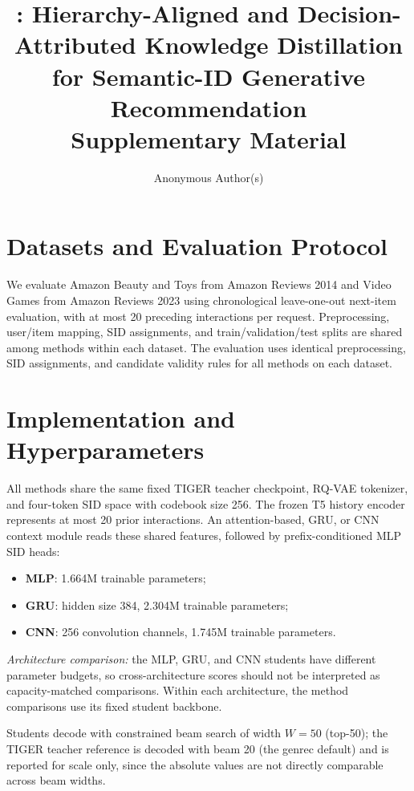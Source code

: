 \documentclass[sigconf, anonymous, review]{acmart}
\title{\method: Hierarchy-Aligned and Decision-Attributed Knowledge
Distillation for Semantic-ID Generative Recommendation\\
Supplementary Material}
\author{Anonymous Author(s)}
\affiliation{%
  \institution{Anonymous Institution}
  \city{Anonymous City}
  \country{Anonymous Country}
}
\begin{document}
\maketitle

\section{Datasets and Evaluation Protocol}
\label{sec:sup-datasets}

We evaluate Amazon Beauty and Toys from Amazon Reviews 2014 and Video
Games from Amazon Reviews 2023 using chronological leave-one-out
next-item evaluation, with at most 20 preceding interactions per
request. Preprocessing, user/item mapping, SID assignments, and
train/validation/test splits are shared among methods within each
dataset. The evaluation uses identical preprocessing, SID assignments,
and candidate validity rules for all methods on each dataset.

\section{Implementation and Hyperparameters}
\label{sec:sup-hyper}

All methods share the same fixed TIGER teacher checkpoint, RQ-VAE
tokenizer, and four-token SID space with codebook size 256. The frozen T5 history encoder represents at most 20 prior
interactions. An attention-based, GRU, or CNN context module reads these
shared features, followed by prefix-conditioned MLP SID heads:

\begin{itemize}
\item \textbf{MLP}: 1.664M trainable parameters;
\item \textbf{GRU}: hidden size 384, 2.304M trainable parameters;
\item \textbf{CNN}: 256 convolution channels, 1.745M trainable parameters.
\end{itemize}

\noindent\emph{Architecture comparison:} the MLP, GRU, and CNN students
have different parameter budgets, so cross-architecture scores should
not be interpreted as capacity-matched comparisons. Within each
architecture, the method comparisons use its fixed student backbone.

Students decode with constrained beam search of width $W=50$
(top-50); the TIGER teacher reference is decoded with beam 20 (the
genrec default) and is reported for scale only, since the absolute
values are not directly comparable across beam widths.
\end{document}
